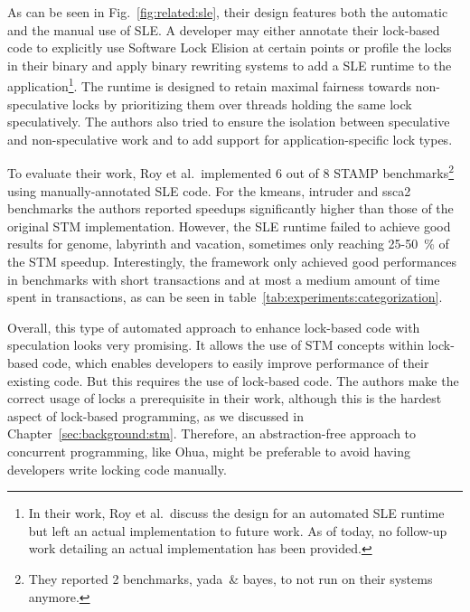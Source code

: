 As can be seen in Fig.~\ref{fig:related:sle}, their design features both the automatic and the manual use of SLE.
A developer may either annotate their lock-based code to explicitly use Software Lock Elision at certain points or profile the locks in their binary and apply binary rewriting systems to add a SLE runtime to the application\footnote{In their work, Roy et al.\ discuss the design for an automated SLE runtime but left an actual implementation to future work. As of today, no follow-up work detailing an actual implementation has been provided.}.
The runtime is designed to retain maximal fairness towards non-speculative locks by prioritizing them over threads holding the same lock speculatively.
The authors also tried to ensure the isolation between speculative and non-speculative work and to add support for application-specific lock types.

To evaluate their work, Roy et al.\ implemented 6 out of 8 STAMP benchmarks\footnote{They reported 2 benchmarks, yada~\& bayes, to not run on their systems anymore.} using manually-annotated SLE code.
For the kmeans, intruder and ssca2 benchmarks the authors reported speedups significantly higher than those of the original STM implementation.
However, the SLE runtime failed to achieve good results for genome, labyrinth and vacation, sometimes only reaching 25-50~\% of the STM speedup.
Interestingly, the framework only achieved good performances in benchmarks with short transactions and at most a medium amount of time spent in transactions, as can be seen in table~\ref{tab:experiments:categorization}.

Overall, this type of automated approach to enhance lock-based code with speculation looks very promising.
It allows the use of STM concepts within lock-based code, which enables developers to easily improve performance of their existing code.
But this requires the use of lock-based code.
The authors make the correct usage of locks a prerequisite in their work, although this is the hardest aspect of lock-based programming, as we discussed in Chapter~\ref{sec:background:stm}.
Therefore, an abstraction-free approach to concurrent programming, like Ohua, might be preferable to avoid having developers write locking code manually.

